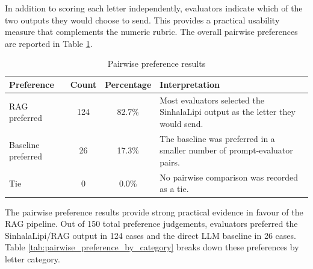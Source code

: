 \documentclass[12pt]{uomthesis}
\begin{document}
In addition to scoring each letter independently, evaluators indicate which of the two outputs they would choose to send. This provides a practical usability measure that complements the numeric rubric. The overall pairwise preferences are reported in Table \ref{tab:pairwise_preference_results}.

\begin{table}[!htbp]
\centering
\small
\begin{tabularx}{\linewidth}{@{}lccX@{}}
\toprule
\textbf{Preference} & \textbf{Count} & \textbf{Percentage} & \textbf{Interpretation} \\
\midrule
RAG preferred & 124 & 82.7\% & Most evaluators selected the SinhalaLipi output as the letter they would send. \\
Baseline preferred & 26 & 17.3\% & The baseline was preferred in a smaller number of prompt-evaluator pairs. \\
Tie & 0 & 0.0\% & No pairwise comparison was recorded as a tie. \\
\bottomrule
\end{tabularx}
\caption{Pairwise preference results}
\label{tab:pairwise_preference_results}
\end{table}

The pairwise preference results provide strong practical evidence in favour of the RAG pipeline. Out of 150 total preference judgements, evaluators preferred the SinhalaLipi/RAG output in 124 cases and the direct LLM baseline in 26 cases. Table \ref{tab:pairwise_preference_by_category} breaks down these preferences by letter category.
\end{document}
